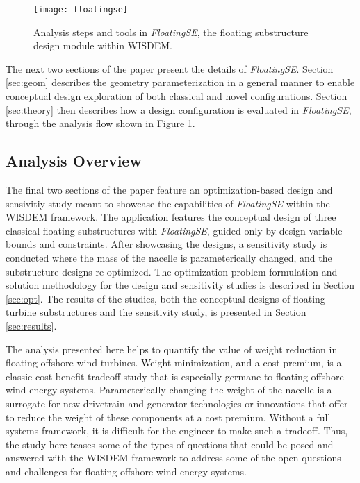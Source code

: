 \begin{figure}[htbp]
  \begin{center}
    \texttt{[image: floatingse]}\\
    \caption{Analysis steps and tools in \textit{FloatingSE}, the floating substructure design module within WISDEM.}
    \label{fig:floatingse}
  \end{center}
\end{figure}

The next two sections of the paper present the details of
\textit{FloatingSE}.  Section \ref{sec:geom} describes the geometry
parameterization in a general manner to enable conceptual design
exploration of both classical and novel configurations.  Section
\ref{sec:theory} then describes how a design configuration is evaluated
in \textit{FloatingSE}, through the analysis flow shown in Figure
\ref{fig:floatingse}.

\subsection{Analysis Overview}
The final two sections of the paper feature an optimization-based design
and sensivitiy study meant to showcase the capabilities of
\textit{FloatingSE} within the WISDEM framework.  The application
features the conceptual design of three classical floating substructures
with \textit{FloatingSE}, guided only by design variable bounds and
constraints.  After showcasing the designs, a sensitivity study is
conducted where the mass of the nacelle is parameterically changed, and
the substructure designs re-optimized.  The optimization problem
formulation and solution methodology for the design and sensitivity
studies is described in Section \ref{sec:opt}.  The results of the
studies, both the conceptual designs of floating turbine substructures
and the sensitivity study, is presented in Section \ref{sec:results}.

The analysis presented here helps to quantify
the value of weight reduction in floating offshore wind turbines.
Weight minimization, and a cost premium, is a classic cost-benefit
tradeoff study that is especially germane to floating offshore wind
energy systems.  Parameterically changing the weight of the nacelle is a
surrogate for new drivetrain and generator technologies or innovations
that offer to reduce the weight of these components at a cost premium.
Without a full systems framework, it is difficult for the engineer to
make such a tradeoff.  Thus, the study here teases some of the types of
questions that could be posed and answered with the WISDEM framework to
address some of the open questions and challenges for floating offshore
wind energy systems.
